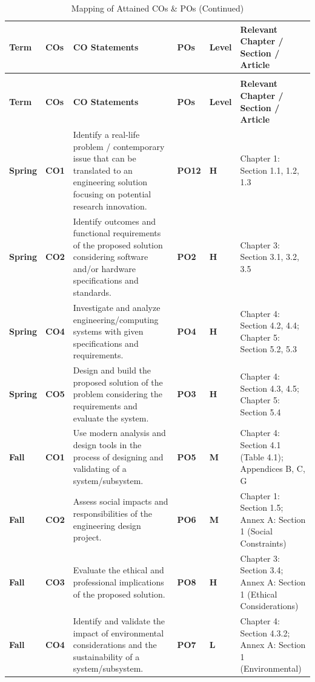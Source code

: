 \begin{longtable}{|>{\centering\arraybackslash}m{1.2cm}|>{\centering\arraybackslash}m{1cm}|p{5.5cm}|>{\centering\arraybackslash}m{1cm}|>{\centering\arraybackslash}m{1cm}|>{\centering\arraybackslash}m{5cm}|}
\caption{Mapping of Attained COs \& POs} \label{tab:co_po_mapping} \\
\hline
\textbf{Term} & \textbf{COs} & \textbf{CO Statements} & \textbf{POs} & \textbf{Level} & \textbf{Relevant Chapter / Section / Article} \\ \hline
\endfirsthead
\caption[]{Mapping of Attained COs \& POs (Continued)} \\
\hline
\textbf{Term} & \textbf{COs} & \textbf{CO Statements} & \textbf{POs} & \textbf{Level} & \textbf{Relevant Chapter / Section / Article} \\ \hline
\endhead

\textbf{Spring} & \textbf{CO1} & Identify a real-life problem / contemporary issue that can be translated to an engineering solution focusing on potential research innovation. & \textbf{PO12} & \textbf{H} & Chapter 1: Section 1.1, 1.2, 1.3 \\ \hline
\textbf{Spring} & \textbf{CO2} & Identify outcomes and functional requirements of the proposed solution considering software and/or hardware specifications and standards. & \textbf{PO2} & \textbf{H} & Chapter 3: Section 3.1, 3.2, 3.5 \\ \hline
\textbf{Spring} & \textbf{CO4} & Investigate and analyze engineering/computing systems with given specifications and requirements. & \textbf{PO4} & \textbf{H} & Chapter 4: Section 4.2, 4.4; Chapter 5: Section 5.2, 5.3 \\ \hline
\textbf{Spring} & \textbf{CO5} & Design and build the proposed solution of the problem considering the requirements and evaluate the system. & \textbf{PO3} & \textbf{H} & Chapter 4: Section 4.3, 4.5; Chapter 5: Section 5.4 \\ \hline
\textbf{Fall}   & \textbf{CO1} & Use modern analysis and design tools in the process of designing and validating of a system/subsystem. & \textbf{PO5} & \textbf{M} & Chapter 4: Section 4.1 (Table 4.1); Appendices B, C, G \\ \hline
\textbf{Fall}   & \textbf{CO2} & Assess social impacts and responsibilities of the engineering design project. & \textbf{PO6} & \textbf{M} & Chapter 1: Section 1.5; Annex A: Section 1 (Social Constraints) \\ \hline
\textbf{Fall}   & \textbf{CO3} & Evaluate the ethical and professional implications of the proposed solution. & \textbf{PO8} & \textbf{H} & Chapter 3: Section 3.4; Annex A: Section 1 (Ethical Considerations) \\ \hline
\textbf{Fall}   & \textbf{CO4} & Identify and validate the impact of environmental considerations and the sustainability of a system/subsystem. & \textbf{PO7} & \textbf{L} & Chapter 4: Section 4.3.2; Annex A: Section 1 (Environmental) \\ \hline
\end{longtable}

